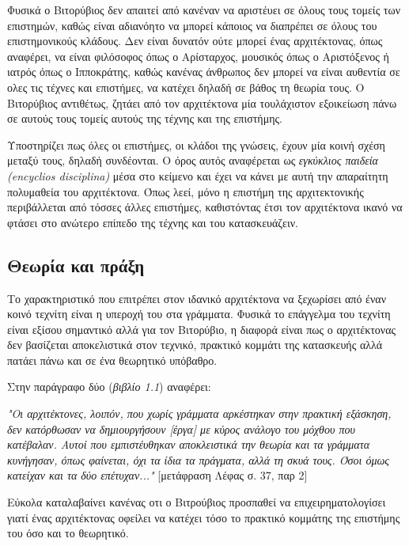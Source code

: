 Φυσικά ο Βιτορύβιος δεν απαιτεί από κανέναν να αριστέυει σε όλους τους τομείς των επιστημών, καθώς είναι αδιανόητο να μπορεί κάποιος να διαπρέπει σε όλους του επιστημονικούς κλάδους. Δεν είναι δυνατόν ούτε μπορεί ένας αρχιτέκτονας, όπως αναφέρει, να είναι φιλόσοφος όπως ο Αρίσταρχος, μουσικός όπως ο Αριστόξενος ή ιατρός όπως ο Ιπποκράτης, καθώς κανένας άνθρωπος δεν μπορεί να είναι αυθεντία σε ολες τις τέχνες και επιστήμες, να κατέχει δηλαδή σε βάθος τη θεωρία τους. Ο Βιτορύβιος αντιθέτως, ζητάει από τον αρχιτέκτονα μία τουλάχιστον εξοικείωση πάνω σε αυτούς τους τομείς αυτούς της τέχνης και της επιστήμης. \cite[45]{vitruvius-lefas} 

Υποστηρίζει πως όλες οι επιστήμες, οι κλάδοι της γνώσεις, έχουν μία κοινή σχέση μεταξύ τους, δηλαδή συνδέονται. Ο όρος αυτός αναφέρεται ως \emph{εγκύκλιος παιδεία (encyclios disciplina)} μέσα στο κείμενο και έχει να κάνει με αυτή την απαραίτητη πολυμαθεία του αρχιτέκτονα. Όπως λεεί, μόνο η επιστήμη της αρχιτεκτονικής περιβάλλεται από τόσσες άλλες επιστήμες, καθιστόντας έτσι τον αρχιτέκτονα ικανό να φτάσει στο ανώτερο επίπεδο της τέχνης και του κατασκευάζειν. \cite[σ. 45]{vitruvius-lefas}

\subsection{Θεωρία και πράξη}

Το χαρακτηριστικό που επιτρέπει στον  ιδανικό αρχιτέκτονα να ξεχωρίσει από έναν κοινό τεχνίτη είναι η υπεροχή του στα γράμματα. \cite[σ. 9]{masterson_status_2004} Φυσικά το επάγγελμα του τεχνίτη είναι εξίσου σημαντικό αλλά για τον Βιτορύβιο, η διαφορά είναι πως ο αρχιτέκτονας δεν βασίζεται αποκελιστικά στον τεχνικό, πρακτικό κομμάτι της κατασκευής αλλά πατάει πάνω και σε ένα θεωρητικό υπόβαθρο. 

Στην παράγραφο δύο (\emph{βιβλίο 1.1}) αναφέρει:

\textit{"Οι αρχιτέκτονες, λοιπόν, που χωρίς γράμματα αρκέστηκαν στην πρακτική εξάσκηση,  δεν κατόρθωσαν να δημιουργήσουν [έργα] με κύρος ανάλογο του μόχθου που κατέβαλαν. Αυτοί που εμπιστέυθηκαν αποκλειστικά την θεωρία και τα γράμματα κυνήγησαν, όπως φαίνεται, όχι τα ίδια τα πράγματα, αλλά τη σκυά τους. Όσοι όμως κατείχαν και τα δύο επέτυχαν..."} [μετάφραση Λέφας σ. 37, παρ 2]

Εύκολα καταλαβαίνει κανένας οτι ο Βιτρούβιος προσπαθεί να επιχειρηματολογίσει γιατί ένας αρχιτέκτονας οφείλει να κατέχει τόσο το πρακτικό κομμάτης της επιστήμης του όσο και το θεωρητικό.

